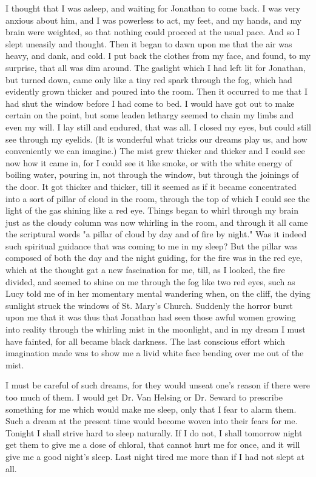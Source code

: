 I thought that I was asleep, and waiting for Jonathan to come back. I was very anxious about him, and I was powerless to act, my feet, and my hands, and my brain were weighted, so that nothing could proceed at the usual pace. And so I slept uneasily and thought. Then it began to dawn upon me that the air was heavy, and dank, and cold. I put back the clothes from my face, and found, to my surprise, that all was dim around. The gaslight which I had left lit for Jonathan, but turned down, came only like a tiny red spark through the fog, which had evidently grown thicker and poured into the room. Then it occurred to me that I had shut the window before I had come to bed. I would have got out to make certain on the point, but some leaden lethargy seemed to chain my limbs and even my will. I lay still and endured, that was all. I closed my eyes, but could still see through my eyelids. (It is wonderful what tricks our dreams play us, and how conveniently we can imagine.) The mist grew thicker and thicker and I could see now how it came in, for I could see it like smoke, or with the white energy of boiling water, pouring in, not through the window, but through the joinings of the door. It got thicker and thicker, till it seemed as if it became concentrated into a sort of pillar of cloud in the room, through the top of which I could see the light of the gas shining like a red eye. Things began to whirl through my brain just as the cloudy column was now whirling in the room, and through it all came the scriptural words "a pillar of cloud by day and of fire by night." Was it indeed such spiritual guidance that was coming to me in my sleep? But the pillar was composed of both the day and the night guiding, for the fire was in the red eye, which at the thought gat a new fascination for me, till, as I looked, the fire divided, and seemed to shine on me through the fog like two red eyes, such as Lucy told me of in her momentary mental wandering when, on the cliff, the dying sunlight struck the windows of St. Mary's Church. Suddenly the horror burst upon me that it was thus that Jonathan had seen those awful women growing into reality through the whirling mist in the moonlight, and in my dream I must have fainted, for all became black darkness. The last conscious effort which imagination made was to show me a livid white face bending over me out of the mist. 

I must be careful of such dreams, for they would unseat one's reason if there were too much of them. I would get Dr. Van Helsing or Dr. Seward to prescribe something for me which would make me sleep, only that I fear to alarm them. Such a dream at the present time would become woven into their fears for me. Tonight I shall strive hard to sleep naturally. If I do not, I shall tomorrow night get them to give me a dose of chloral, that cannot hurt me for once, and it will give me a good night's sleep. Last night tired me more than if I had not slept at all. 

